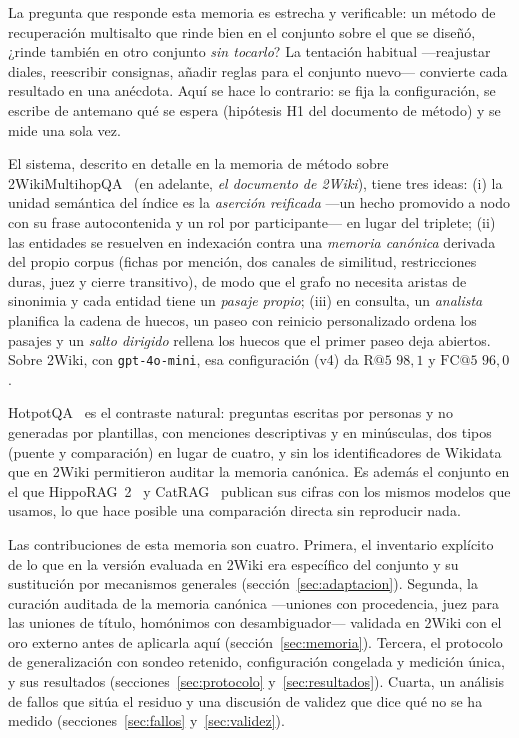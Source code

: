 \documentclass[11pt,a4paper]{article}
\newcommand{\hippo}{HippoRAG~2}
\begin{document}
La pregunta que responde esta memoria es estrecha y verificable: un método
de recuperación multisalto que rinde bien en el conjunto sobre el que se
diseñó, ¿rinde también en otro conjunto \emph{sin tocarlo}? La tentación
habitual ---reajustar diales, reescribir consignas, añadir reglas para el
conjunto nuevo--- convierte cada resultado en una anécdota. Aquí se hace lo
contrario: se fija la configuración, se escribe de antemano qué se espera
(hipótesis H1 del documento de método) y se mide una sola vez.

El sistema, descrito en detalle en la memoria de método sobre
2WikiMultihopQA~\cite{wiki2} (en adelante, \emph{el documento de 2Wiki}),
tiene tres ideas: (i) la unidad semántica del índice es la \emph{aserción
reificada} ---un hecho promovido a nodo con su frase autocontenida y un rol
por participante--- en lugar del triplete; (ii) las entidades se resuelven
en indexación contra una \emph{memoria canónica} derivada del propio corpus
(fichas por mención, dos canales de similitud, restricciones duras, juez y
cierre transitivo), de modo que el grafo no necesita aristas de sinonimia y
cada entidad tiene un \emph{pasaje propio}; (iii) en consulta, un
\emph{analista} planifica la cadena de huecos, un paseo con reinicio
personalizado ordena los pasajes y un \emph{salto dirigido} rellena los
huecos que el primer paseo deja abiertos. Sobre 2Wiki, con
\texttt{gpt-4o-mini}, esa configuración (v4) da $\mathrm{R@}5$ $98{,}1$ y
$\mathrm{FC@}5$ $96{,}0$.

HotpotQA~\cite{hotpotqa} es el contraste natural: preguntas escritas por
personas y no generadas por plantillas, con menciones descriptivas y en
minúsculas, dos tipos (puente y comparación) en lugar de cuatro, y sin los
identificadores de Wikidata que en 2Wiki permitieron auditar la memoria
canónica. Es además el conjunto en el que \hippo{}~\cite{hipporag2} y
CatRAG~\cite{catrag} publican sus cifras con los mismos modelos que usamos,
lo que hace posible una comparación directa sin reproducir nada.

Las contribuciones de esta memoria son cuatro. Primera, el inventario
explícito de lo que en la versión evaluada en 2Wiki era específico del
conjunto y su sustitución por mecanismos generales
(sección~\ref{sec:adaptacion}). Segunda, la curación auditada de la memoria
canónica ---uniones con procedencia, juez para las uniones de título,
homónimos con desambiguador--- validada en 2Wiki con el oro externo antes de
aplicarla aquí (sección~\ref{sec:memoria}). Tercera, el protocolo de
generalización con sondeo retenido, configuración congelada y medición
única, y sus resultados (secciones~\ref{sec:protocolo}
y~\ref{sec:resultados}). Cuarta, un análisis de fallos que sitúa el residuo
y una discusión de validez que dice qué no se ha medido
(secciones~\ref{sec:fallos} y~\ref{sec:validez}).
\end{document}
